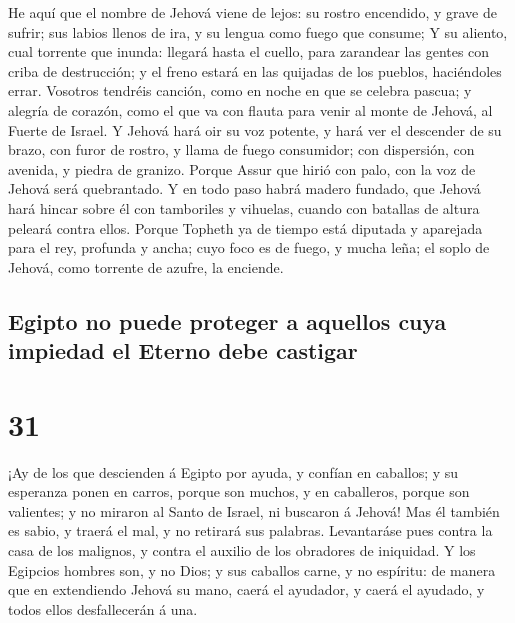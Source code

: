  He aquí que el nombre de Jehová viene de lejos: su
rostro encendido, y grave de sufrir; sus labios llenos de ira, y su
lengua como fuego que consume;  Y su aliento, cual
torrente que inunda: llegará hasta el cuello, para zarandear las gentes
con criba de destrucción; y el freno estará en las quijadas de los
pueblos, haciéndoles errar.  Vosotros tendréis canción,
como en noche en que se celebra pascua; y alegría de corazón, como el
que va con flauta para venir al monte de Jehová, al Fuerte de Israel.
 Y Jehová hará oir su voz potente, y hará ver el
descender de su brazo, con furor de rostro, y llama de fuego consumidor;
con dispersión, con avenida, y piedra de granizo.  Porque
Assur que hirió con palo, con la voz de Jehová será quebrantado.
 Y en todo paso habrá madero fundado, que Jehová hará
hincar sobre él con tamboriles y vihuelas, cuando con batallas de altura
peleará contra ellos.  Porque Topheth ya de tiempo está
diputada y aparejada para el rey, profunda y ancha; cuyo foco es de
fuego, y mucha leña; el soplo de Jehová, como torrente de azufre, la
enciende.

\hypertarget{egipto-no-puede-proteger-a-aquellos-cuya-impiedad-el-eterno-debe-castigar}{%
\subsection{Egipto no puede proteger a aquellos cuya impiedad el Eterno
debe
castigar}\label{egipto-no-puede-proteger-a-aquellos-cuya-impiedad-el-eterno-debe-castigar}}

\hypertarget{section-23-31}{%
\section{31}\label{section-23-31}}

 ¡Ay de los que descienden á Egipto por ayuda, y confían
en caballos; y su esperanza ponen en carros, porque son muchos, y en
caballeros, porque son valientes; y no miraron al Santo de Israel, ni
buscaron á Jehová!  Mas él también es sabio, y traerá el
mal, y no retirará sus palabras. Levantaráse pues contra la casa de los
malignos, y contra el auxilio de los obradores de iniquidad.
 Y los Egipcios hombres son, y no Dios; y sus caballos
carne, y no espíritu: de manera que en extendiendo Jehová su mano, caerá
el ayudador, y caerá el ayudado, y todos ellos desfallecerán á una.

